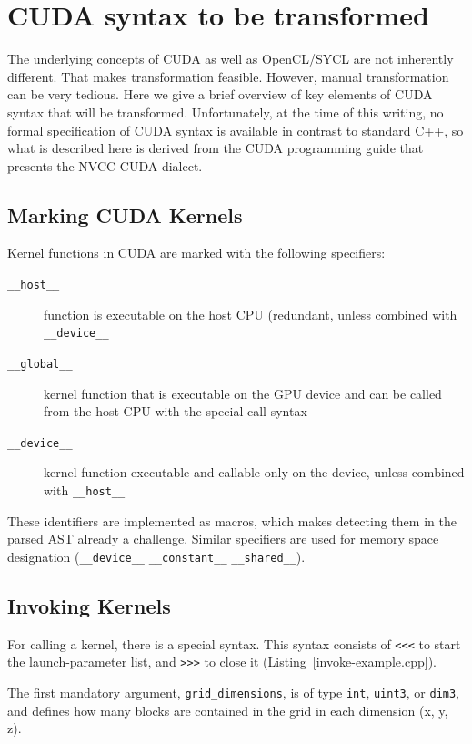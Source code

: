 \documentclass[sigconf]{acmart}
\newcommand{\inputcode}[2]{}
\newcommand{\tcode}[1]{\texttt{#1}}
\newcommand{\intt}[1]{\texttt{#1}}
\begin{document}
\section{CUDA syntax to be transformed}
The underlying concepts of CUDA as well as OpenCL/SYCL are not inherently different. That makes transformation feasible. However, manual transformation can be very tedious.
Here we give a brief overview of key elements of CUDA syntax that will be transformed. Unfortunately, at the time of this writing, no formal specification of CUDA syntax is available in contrast to standard C++\cite{isocpp}, so what is described here is derived from  the CUDA programming guide\cite{CUDACProgGuide} that presents the NVCC CUDA dialect.

\subsection{Marking CUDA Kernels}
Kernel functions in CUDA are marked with the following specifiers:
\begin{description}
\item[\tcode{__host__}] function is executable on the host CPU (redundant, unless combined with \tcode{__device__}
\item[\tcode{__global__}] kernel function that is executable on the GPU device and can be called from the host CPU with the special call syntax
\item[\tcode{__device__}] kernel function executable and callable only on the device, unless combined with \tcode{__host__}
\end{description}
These identifiers are implemented as macros, which makes detecting them in the parsed AST already a challenge. Similar specifiers are used for memory space designation (\tcode{__device__} \tcode{__constant__} \tcode{__shared__}). 


\subsection{Invoking Kernels}
    For calling a kernel, there is a special syntax. This syntax consists of \intt{<{}<{}<} to start the launch-parameter list, and \intt{>{}>{}>} to close it (Listing~\ref{invoke-example.cpp}).
    
    \inputcode{invoke-example.cpp}{Special CUDA kernel invocation syntax}
    
    The first mandatory argument, \intt{grid_dimensions}, is of type \intt{int}, \intt{uint3}, or \intt{dim3}, and defines how many blocks are contained in the grid in each dimension (x, y, z). %
    
\end{document}
